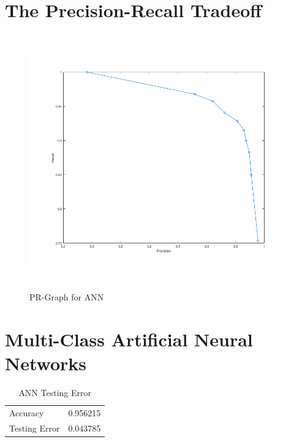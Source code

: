 \documentclass[12pt]{article}
\begin{document}
\newpage

\section{The Precision-Recall Tradeoff}\label{naive}
\begin{figure}[H]
\begin{center}
\includegraphics[height=11cm]{problem2_PRC.png}
\caption{PR-Graph for ANN}
\end{center}
\end{figure}

\newpage
\section{Multi-Class Artificial Neural Networks}
\begin{table}[h]
\begin{center}
\begin{tabular}{|l|l|}
\hline
Accuracy & 0.956215\\
Testing Error & 0.043785\\
\hline
\end{tabular}
\caption{ANN Testing Error}
\end{center}
\end{table}
\end{document}
